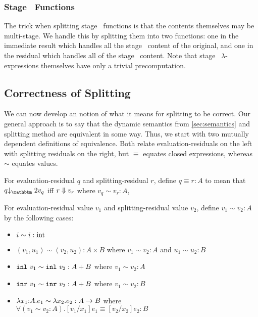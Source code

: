 \subsubsection {Stage \bbone\ Functions}

The trick when splitting stage \bbone\ functions is that the contents themselves may be multi-stage.
We handle this by splitting them into two functions:
one in the immediate result which handles all the stage \bbone\ content of the original,
and one in the residual which handles all of the stage \bbtwo\ content.
Note that stage \bbone\ $\lambda$-expressions themselves have only a trivial precomputation.

%
%



\subsection{Correctness of Splitting}

We can now develop an notion of what it means for splitting to be correct.  
Our general approach is to say that the dynamic semantics from \ref{sec:semantics} and splitting method are equivalent in some way.  
Thus, we start with two mutually dependent definitions of equivalence.  
Both relate evaluation-residuals on the left with splitting residuals on the right,
but $\equiv$ equates closed expressions, whereas $\sim$ equates values.

\begin{definition}
For evaluation-residual $q$ and splitting-residual $r$, define $q \equiv r : A$ to mean that 
$q \tworedsym v_q$ iff ${r} \Downarrow {v_r}$ where $v_q \sim v_r : A$, 
\end{definition}

\begin{definition}
For evaluation-residual value $v_1$ and splitting-residual value $v_2$, define $v_1 \sim v_2 : A$ by the following cases:
\begin{itemize}
\item $i \sim i : {\rm int}$
\item $(v_1,u_1) \sim (v_2,u_2) : A \times B$ where $v_1 \sim v_2 : A$ and $u_1 \sim u_2 : B$
\item ${\tt inl}~v_1 \sim {\tt inl}~v_2 : A + B$ where $v_1 \sim v_2 : A$
\item ${\tt inr}~v_1 \sim {\tt inr}~v_2 : A + B$ where $v_1 \sim v_2 : B$
\item $\lambda{x_1}\mathrm{:}{A}.{e_1} \sim \lambda x_2.e_2 : A \to B$ where \\ $\forall (v_1 \sim v_2 : A). [v_1/x_1]e_1 \equiv [v_2/x_2]e_2 : B$
\end{itemize}
\end{definition}


